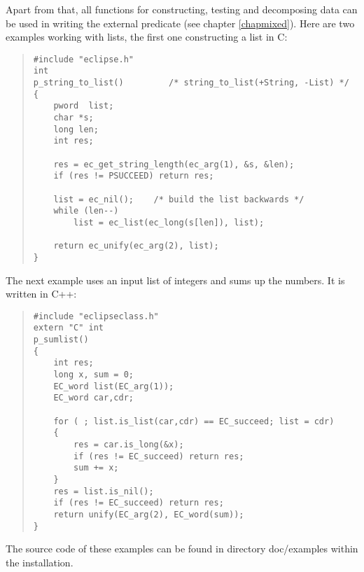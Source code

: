 Apart from that, all functions for constructing, testing and decomposing
{\eclipse} data can be used in writing the external predicate
(see chapter \ref{chapmixed}).
Here are two examples working with lists, the first one constructing
a list in C:
\begin{quote}\begin{verbatim}
#include "eclipse.h"
int
p_string_to_list()         /* string_to_list(+String, -List) */
{
    pword  list;
    char *s;
    long len;
    int res;

    res = ec_get_string_length(ec_arg(1), &s, &len);
    if (res != PSUCCEED) return res;

    list = ec_nil();    /* build the list backwards */
    while (len--)
        list = ec_list(ec_long(s[len]), list);

    return ec_unify(ec_arg(2), list);
}
\end{verbatim}\end{quote}
The next example uses an input list of integers and sums up the numbers.
It is written in C++:
\begin{quote}\begin{verbatim}
#include "eclipseclass.h"
extern "C" int
p_sumlist()
{
    int res;
    long x, sum = 0;
    EC_word list(EC_arg(1));
    EC_word car,cdr;

    for ( ; list.is_list(car,cdr) == EC_succeed; list = cdr)
    {
        res = car.is_long(&x);
        if (res != EC_succeed) return res;
        sum += x;
    }
    res = list.is_nil();
    if (res != EC_succeed) return res;
    return unify(EC_arg(2), EC_word(sum));
}
\end{verbatim}\end{quote}
The source code of these examples can be found in directory
doc/examples within the {\eclipse} installation.

